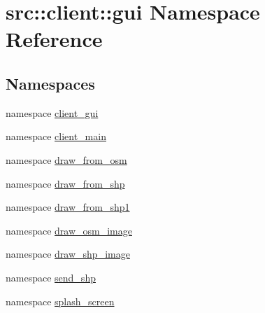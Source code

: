 \hypertarget{namespacesrc_1_1client_1_1gui}{
\section{src::client::gui Namespace Reference}
\label{namespacesrc_1_1client_1_1gui}
}
\subsection*{Namespaces}
\begin{DoxyCompactItemize}
\item 
namespace \hyperlink{namespacesrc_1_1client_1_1gui_1_1client__gui}{client\_\-gui}
\item 
namespace \hyperlink{namespacesrc_1_1client_1_1gui_1_1client__main}{client\_\-main}
\item 
namespace \hyperlink{namespacesrc_1_1client_1_1gui_1_1draw__from__osm}{draw\_\-from\_\-osm}
\item 
namespace \hyperlink{namespacesrc_1_1client_1_1gui_1_1draw__from__shp}{draw\_\-from\_\-shp}
\item 
namespace \hyperlink{namespacesrc_1_1client_1_1gui_1_1draw__from__shp1}{draw\_\-from\_\-shp1}
\item 
namespace \hyperlink{namespacesrc_1_1client_1_1gui_1_1draw__osm__image}{draw\_\-osm\_\-image}
\item 
namespace \hyperlink{namespacesrc_1_1client_1_1gui_1_1draw__shp__image}{draw\_\-shp\_\-image}
\item 
namespace \hyperlink{namespacesrc_1_1client_1_1gui_1_1send__shp}{send\_\-shp}
\item 
namespace \hyperlink{namespacesrc_1_1client_1_1gui_1_1splash__screen}{splash\_\-screen}
\end{DoxyCompactItemize}
